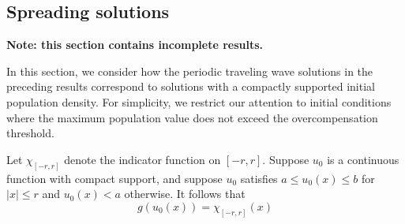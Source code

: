 \documentclass[11pt]{article}
\newtheorem{lem}[thm]{Lemma}
\theoremstyle{definition}
\numberwithin{equation}{section}
\numberwithin{thm}{section}
\renewcommand{\a}{a}
\renewcommand{\b}{b}
\begin{document}
\subsection{Spreading solutions}

\textbf{Note: this section contains incomplete results.}


In this section, we consider how the periodic traveling wave solutions in the preceding results correspond to solutions with a compactly supported initial population density. For simplicity, we restrict our attention to initial conditions where the maximum population value does not exceed the overcompensation threshold.

Let $\chi_{[-r,r]}$ denote the indicator function on $[-r,r]$. Suppose $u_0$ is a continuous function with compact support, and suppose $u_0$ satisfies $\a \leq u_0(x) \leq \b$ for $|x| \leq r$ and $u_0(x) < \a$ otherwise. It follows that
$$ g(u_0(x)) = \chi_{[-r,r]}(x) $$

%
%
%
\end{document}
